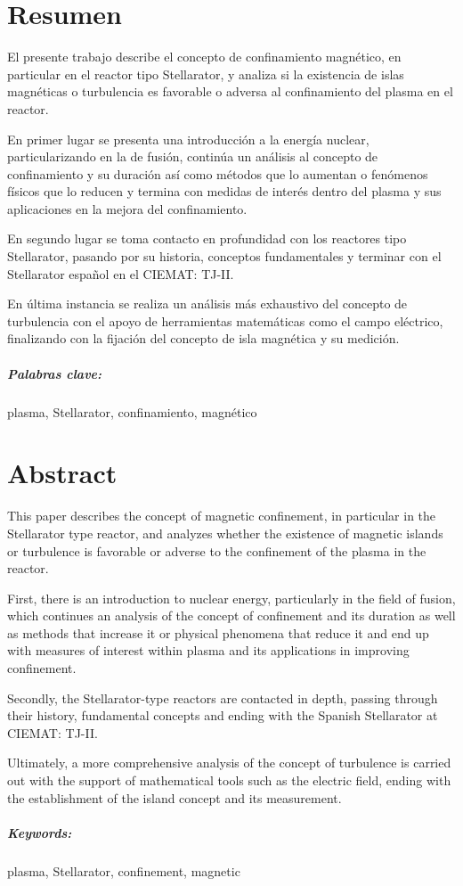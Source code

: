 \chapter*{Resumen}
El presente trabajo describe el concepto de confinamiento magnético, en particular en el reactor tipo Stellarator, y analiza si la existencia de islas magnéticas o turbulencia es favorable o adversa
al confinamiento del plasma en el reactor.\par
En primer lugar se presenta una introducción a la energía nuclear, particularizando en la de fusión, continúa
un análisis al concepto de confinamiento y su duración así como métodos que lo aumentan o fenómenos físicos que lo reducen y termina con medidas
de interés dentro del plasma y sus aplicaciones en la mejora del confinamiento.\par
En segundo lugar se toma contacto en profundidad con los reactores tipo Stellarator, pasando por su historia, 
conceptos fundamentales y terminar con el Stellarator español en el CIEMAT: TJ-II.\par
En última instancia se realiza un análisis más exhaustivo del concepto de turbulencia con el apoyo
de herramientas matemáticas como el campo eléctrico, finalizando con la fijación del concepto de isla
magnética y su medición.\par
\paragraph{Palabras clave:} plasma, Stellarator, confinamiento, magnético
\chapter*{Abstract}
This paper describes the concept of magnetic confinement, in particular in the Stellarator type reactor, and analyzes whether the existence of magnetic islands or turbulence is favorable or adverse
to the confinement of the plasma in the reactor.\par
First, there is an introduction to nuclear energy, particularly in the field of fusion, which continues 
an analysis of the concept of confinement and its duration as well as methods that increase it or physical 
phenomena that reduce it and end up with measures of interest within plasma and its applications in improving confinement.\par
Secondly, the Stellarator-type reactors are contacted in depth, passing through their history, 
fundamental concepts and ending with the Spanish Stellarator at CIEMAT: TJ-II.\par
Ultimately, a more comprehensive analysis of the concept of turbulence is carried out with the support
of mathematical tools such as the electric field, ending with the establishment of the island concept
and its measurement.\par
\paragraph{Keywords:} plasma, Stellarator, confinement, magnetic
